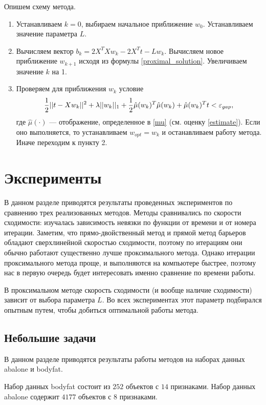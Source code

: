 \documentclass[12pt]{article}
\begin{document}
	Опишем схему метода.
	\begin{enumerate}
		\item Устанавливаем $k = 0$, выбираем начальное приближение $w_0$. Устанавливаем значение параметра $L$.
		
		\item Вычисляем вектор $b_k =  2 X^T X w_k - 2 X^T t - L w_k$. Вычисляем новое приближение $w_{k+1}$ исходя из формулы \ref{proximal_solution}. Увеличиваем значение $k$ на 1.
		
		\item Проверяем для приближения $w_k$ условие
		$$\frac 1 2 ||t - X w_k||^2 + \lambda ||w_k||_1 + \frac 1 2 \hat\mu(w_k)^T \hat\mu(w_k) + \hat\mu(w_k)^T t < \varepsilon_{gap}, $$
		где $\hat\mu(\cdot)$ — отображение, определенное в \ref{mu}  (см. оценку \ref{estimate}). Если оно выполняется, то устанавливаем $w_{opt} = w_k$ и останавливаем работу метода. Иначе переходим к пункту 2.

	\end{enumerate}
	
\section{Эксперименты}
	
	В данном разделе приводятся результаты проведенных экспериментов по сравнению трех реализованных методов. Методы сравнивались по скорости сходимости: изучалась зависимость невязки по функции от времени и от номера итерации. Заметим, что прямо-двойственный метод и прямой метод барьеров обладают сверхлинейной скоростью сходимости, поэтому по итерациям они обычно работают существенно лучше проксимального метода. Однако итерации проксимального метода проще, и выполняются на компьютере быстрее, поэтому нас в первую очередь будет интересовать именно сравнение по времени работы.
	
	В проксимальном методе скорость сходимости (и вообще наличие сходимости) зависит от выбора параметра $L$. Во всех экспериментах этот параметр подбирался опытным путем, чтобы добиться оптимальной работы метода. 
	
	\subsection{Небольшие задачи}
	
	В данном разделе приводятся результаты работы методов на наборах данных abalone и bodyfat.
	
	Набор данных bodyfat состоит из $252$ объектов с $14$ признаками. Набор данных abalone содержит $4177$ объектов с 8 признаками. 
	
\end{document}
